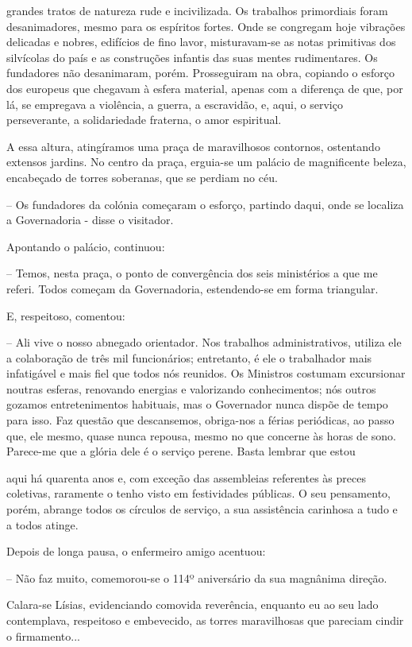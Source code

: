 \documentclass[portuguese,12pt,a4paper]{scrbook}
\begin{document}
	
	grandes tratos de natureza rude e incivilizada. Os trabalhos primordiais foram desanimadores, mesmo para os espíritos fortes. Onde se congregam hoje vibrações delicadas e nobres, edifícios de fino lavor, misturavam-se as notas primitivas dos silvícolas do país e as construções infantis das suas mentes rudimentares. Os fundadores não desanimaram, porém. Prosseguiram na obra, copiando o esforço dos europeus que chegavam à esfera material, apenas com a diferença de que, por lá, se empregava a violência, a guerra, a escravidão, e, aqui, o serviço perseverante, a solidariedade fraterna, o amor espiritual.
	
	A essa altura, atingíramos uma praça de maravilhosos contornos, ostentando extensos jardins. No centro da praça, erguia-se um palácio de magnificente beleza, encabeçado de torres soberanas, que se perdiam no céu.
	
	– Os fundadores da colónia começaram o esforço, partindo daqui, onde se localiza a Governadoria - disse o visitador.
	
	Apontando o palácio, continuou:
	
	– Temos, nesta praça, o ponto de convergência dos seis ministérios a que me referi. Todos começam da Governadoria, estendendo-se em forma triangular.
	
	E, respeitoso, comentou:
	
	– Ali vive o nosso abnegado orientador. Nos trabalhos administrativos, utiliza ele a colaboração de três mil funcionários; entretanto, é ele o trabalhador mais infatigável e mais fiel que todos nós reunidos. Os Ministros costumam excursionar noutras esferas, renovando energias e valorizando conhecimentos; nós outros gozamos entretenimentos habituais, mas o Governador nunca dispõe de tempo para isso. Faz questão que descansemos, obriga-nos a férias periódicas, ao passo que, ele mesmo, quase nunca repousa, mesmo no que concerne às horas de sono. Parece-me que a glória dele é o serviço perene. Basta lembrar que estou
	
	
	aqui há quarenta anos e, com exceção das assembleias referentes às preces coletivas, raramente o tenho visto em festividades públicas. O seu pensamento, porém, abrange todos os círculos de serviço, a sua assistência carinhosa a tudo e a todos atinge.
	
	Depois de longa pausa, o enfermeiro amigo acentuou:
	
	– Não faz muito, comemorou-se o 114º aniversário da sua magnânima direção.
	
	Calara-se Lísias, evidenciando comovida reverência, enquanto eu ao seu lado contemplava, respeitoso e embevecido, as torres maravilhosas que pareciam cindir o firmamento...
	
\end{document}
